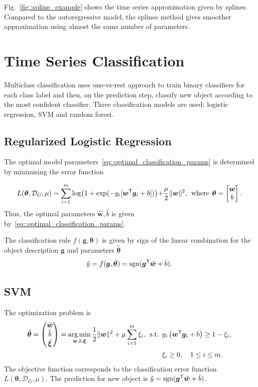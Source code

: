 Fig.~\ref{fig::spline_example} shows the time series approximation given by splines. 
Compared to the autoregressive model, the splines method gives smoother approximation using almost the same number of parameters.

\section{Time Series Classification}
Multiclass classification uses one-vs-rest approach to train binary classifiers for each class label and then, on the prediction step, classify new object according to the most confident classifier. Three classification models are used: logistic regression, SVM and random forest.

\subsection{Regularized Logistic Regression}
The optimal model parameters~\eqref{eq::optimal_classification_params} is determined by minimising the error function

\begin{equation*}
L(\bm{\theta}, \mathcal{D}_G, \mu) = \sum_{i=1}^{m} \log\bigl(1 + \exp(-y_i [\bm{w}^{{\mbox{\scriptsize\sffamily\upshape\mdseries T}}} \bm{g}_i + b])\bigl) + \frac{\mu}{2} \|\bm{w}\|^2, \:\:\mbox{where}\:\: \bm{\theta}  = \begin{bmatrix}
\bm{w} \\ b
\end{bmatrix}.
\end{equation*}
Thus, the optimal parameters $\hat{\bm{w}}, \hat{b}$ is given by~\eqref{eq::optimal_classification_params}.

The classification rule $f(\bm{g}, \bm{\theta})$ is given by sign of the linear combination for the object description $\bm{g}$ and parameters $\hat{\bm{\theta}}$
\begin{equation*}
\hat{y} = f(\bm{g}, \hat{\bm{\theta}}) = \operatorname{\mathop{sgn}}(\bm{g}^{{\mbox{\scriptsize\sffamily\upshape\mdseries T}}} \hat{\bm{w}} + \hat{b}).
\end{equation*}

\subsection{SVM}
The optimization problem is
\begin{align*}
\hat{\bm{\theta}}  = \begin{pmatrix}
\hat{\bm{w}} \\ \hat{b} \\ \hat{\bm{\xi}}
\end{pmatrix}= \operatorname*{arg\,min}_{\bm{w}, b, \bm{\xi}}  \frac{1}{2} \|\bm{w}\|^2 + \mu \sum_{i=1}^{m} \xi_i,\:\:
\mbox{s.t.} \:\: &y_i \left(\bm{w}^{{\mbox{\scriptsize\sffamily\upshape\mdseries T}}} \bm{g}_i + b\right) \geq 1 - \xi_i,\\
&\xi_i \geq 0, \quad 1 \leq i \leq m.
\end{align*}
The objective function corresponds to the classification error function $L(\bm{\theta}, \mathcal{D}_G, \mu)$.
The prediction for new object is $
\hat{y} = \operatorname{\mathop{sgn}} (\bm{g}^{{\mbox{\scriptsize\sffamily\upshape\mdseries T}}} \hat{\bm{w}} + \hat{b})$.

